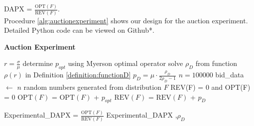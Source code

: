 DAPX = $\frac{\text{OPT}(F)}{\text{REV}(F)}$.\\
Procedure \ref{alg:auctionexperiment} shows our design for the auction experiment. Detailed Python code can be viewed on Github*.
\begin{algorithm}
\caption{\textbf{Auction Experiment}} \label{alg:auctionexperiment}
\begin{algorithmic}[1]
		\State $r = \frac{\sigma}{\mu}$
		\State determine $p_{opt}$ using Myerson optimal operator
		\State solve $\rho_{D}$ from function $\rho(r)$ in Definition \ref{definition:functionD}
		\State $p_D =  \mu \cdot \frac{\rho_{D}}{2\rho_{D}-1}$ 
		\State $n  = 100000$ 
		\State bid\_data $\gets$ $n$ random numbers generated from distribution $F$ 
		\State REV(F) = 0 and OPT(F) = 0
				\State $\text{OPT}(F)$ = $\text{OPT}(F)$ + $p_{opt}$ 
			\EndIf
				\State ${\text{REV}(F)}$ = ${\text{REV}(F)}$ + $p_{D}$ 
			\EndIf
		\EndFor
	
		\State Experimental\_DAPX = $\frac{\text{OPT}(F)}{\text{REV}(F)}$
		\State \Return Experimental\_DAPX ,$\rho_{D}$
	\EndProcedure	
\end{algorithmic}

\end{algorithm}

